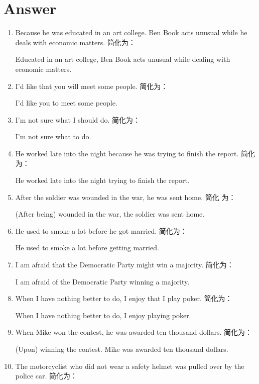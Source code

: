 \section{Answer}
\begin{enumerate}
\item Because he was educated in an art college. Ben Book acts unusual while he
  deals with economic matters. 简化为：

  Educated in an art college, Ben Book acts unusual while dealing with
  economic matters.

\item I'd like that you will meet some people. 简化为：

  I'd like you to meet some people.

\item I'm not sure what I should do. 简化为：

  I'm not sure what to do.

\item He worked late into the night because he was trying to finish the report.
  简化为：

  He worked late into the night trying to finish the report.

\item After the soldier was wounded in the war, he was sent home. 简化
  为：

  (After being) wounded in the war, the soldier was sent home.

\item He used to smoke a lot before he got married. 简化为：

  He used to smoke a lot before getting married.

\item I am afraid that the Democratic Party might win a majority. 简化为：

  I am afraid of the Democratic Party winning a majority.

\item When I have nothing better to do, I enjoy that I play poker. 简化为：

  When I have nothing better to do, I enjoy playing poker.
\item When Mike won the contest, he was awarded ten thousand dollars. 简化为：

  (Upon) winning the contest. Mike was awarded ten thousand dollars.

\item The motorcyclist who did not wear a safety helmet was pulled over by the
  police car. 简化为：


\end{enumerate}
